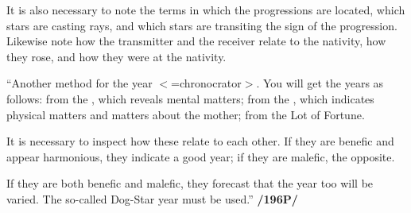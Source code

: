 It is also necessary to note the terms in which the progressions are located, which stars are casting rays, and which stars are transiting the sign of the progression. Likewise note how the transmitter and the receiver relate to the nativity, how they rose, and how they were at the nativity.

“Another method for the year $<$=chronocrator$>$. You will get the years as follows: from the \Sun, which reveals mental matters; from the \Moon, which indicates physical matters and matters about the mother; from the Lot of Fortune. 

It is necessary to inspect how these relate to each other. If they are benefic and appear harmonious, they indicate a good year; if they are malefic, the opposite. 

If they are both benefic and malefic, they forecast that the year too will be varied. The so-called Dog-Star year must be used.” \textbf{/196P/}

\newpage
